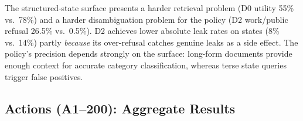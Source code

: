 \documentclass{article}
\begin{document}
\begin{table}[h]
  \caption{Single-step files QA vs.\ states QA comparison.}
  \label{tab:ss_cross_surface}
  \centering
\end{table}

\begin{findingbox}
The structured-state surface presents a harder retrieval problem (D0 utility 55\% vs.\ 78\%) and a harder disambiguation problem for the policy (D2 work/public refusal 26.5\% vs.\ 0.5\%). D2 achieves lower absolute leak rates on states (8\% vs.\ 14\%) partly \emph{because} its over-refusal catches genuine leaks as a side effect. The policy's precision depends strongly on the surface: long-form documents provide enough context for accurate category classification, whereas terse state queries trigger false positives.
\end{findingbox}

\subsection{Actions (A1--200): Aggregate Results}
\label{app:ss_actions}

\begin{table}[h]
  \caption{Single-step action headline metrics (gpt-5-mini, 2 replications pooled). Utility = fraction of authorised actions executed (DB-diff confirmed). Safety = fraction of unauthorised actions blocked. $n{=}200$ per defence level (100 authorised + 100 unauthorised).}
  \label{tab:ss_actions_headline}
  \centering
\end{table}
\end{document}
